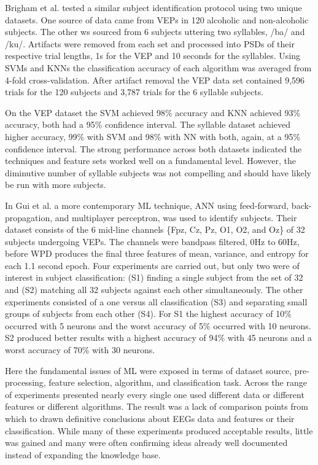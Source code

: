 Brigham et al.\cite{Brigham2010} tested a similar subject identification protocol using two unique datasets. One source of data came from \acp{VEP} in 120 alcoholic and non-alcoholic subjects. The other ws sourced from 6 subjects uttering two syllables, /ba/ and /ku/. Artifacts were removed from each set and processed into \acp{PSD} of their respective trial lengths, 1s for the \ac{VEP} and 10 seconds for the syllables. Using \acp{SVM} and \acp{KNN} the classification accuracy of each algorithm was averaged from 4-fold cross-validation. After artifact removal the \ac{VEP} data set contained 9,596 trials for the 120 subjects and 3,787 trials for the 6 syllable subjects.

On the \ac{VEP} dataset the \ac{SVM} achieved 98\% accuracy and \ac{KNN} achieved 93\% accuracy, both had a 95\% confidence interval. The syllable dataset achieved higher accuracy, 99\% with \ac{SVM} and 98\% with \ac{NN} with both, again, at a 95\% confidence interval. The strong performance across both datasets indicated the techniques and feature sets worked well on a fundamental level. However, the diminutive number of syllable subjects was not compelling and should have likely be run with more subjects.

In Gui et al.\cite{Gui2015} a more contemporary \ac{ML} technique, \ac{ANN} using feed-forward, back-propagation, and multiplayer perceptron, was used to identify subjects. Their dataset consists of the 6 mid-line channels \{Fpz, Cz, Pz, O1, O2, and Oz\} of 32 subjects undergoing \acp{VEP}. The channels were bandpass filtered, 0Hz to 60Hz, before \ac{WPD} produces the final three features of mean, variance, and entropy for each 1.1 second epoch. Four experiments are carried out, but only two were of interest in subject classification: (S1) finding a single subject from the set of 32 and (S2) matching all 32 subjects against each other simultaneously. The other experiments consisted of a one versus all classification (S3) and separating small groups of subjects from each other (S4). For S1 the highest accuracy of 10\% occurred with 5 neurons and the worst accuracy of 5\% occurred with 10 neurons. S2 produced better results with a highest accuracy of 94\% with 45 neurons and a worst accuracy of 70\% with 30 neurons.

Here the fundamental issues of \ac{ML} were exposed in terms of dataset source, pre-processing, feature selection, algorithm, and classification task. Across the range of experiments presented nearly every single one used different data or different features or different algorithms. The result was a lack of comparison points from which to drawn definitive conclusions about \acp{EEG} data and features or their classification. While many of these experiments produced acceptable results, little was gained and many were often confirming ideas already well documented instead of expanding the knowledge base.

